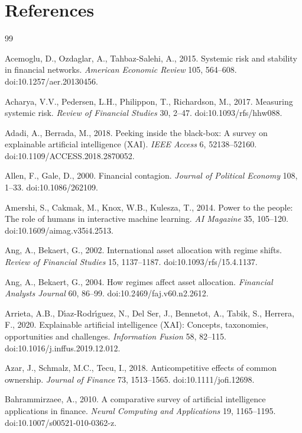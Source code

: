 \documentclass[11pt]{article}
\begin{document}
\clearpage
\endgroup
\fancyfoot[C]{\thepage}
\setcounter{page}{85}

\clearpage
\section*{References}
\small
\begin{thebibliography}{99}

Acemoglu, D., Ozdaglar, A., Tahbaz-Salehi, A., 2015. Systemic risk and stability in financial networks. \textit{American Economic Review} 105, 564--608. doi:10.1257/aer.20130456.

Acharya, V.V., Pedersen, L.H., Philippon, T., Richardson, M., 2017. Measuring systemic risk. \textit{Review of Financial Studies} 30, 2--47. doi:10.1093/rfs/hhw088.

Adadi, A., Berrada, M., 2018. Peeking inside the black-box: A survey on explainable artificial intelligence (XAI). \textit{IEEE Access} 6, 52138--52160. doi:10.1109/ACCESS.2018.2870052.

Allen, F., Gale, D., 2000. Financial contagion. \textit{Journal of Political Economy} 108, 1--33. doi:10.1086/262109.

Amershi, S., Cakmak, M., Knox, W.B., Kulesza, T., 2014. Power to the people: The role of humans in interactive machine learning. \textit{AI Magazine} 35, 105--120. doi:10.1609/aimag.v35i4.2513.

Ang, A., Bekaert, G., 2002. International asset allocation with regime shifts. \textit{Review of Financial Studies} 15, 1137--1187. doi:10.1093/rfs/15.4.1137.

Ang, A., Bekaert, G., 2004. How regimes affect asset allocation. \textit{Financial Analysts Journal} 60, 86--99. doi:10.2469/faj.v60.n2.2612.

Arrieta, A.B., D{\'\i}az-Rodr{\'\i}guez, N., Del Ser, J., Bennetot, A., Tabik, S., Herrera, F., 2020. Explainable artificial intelligence (XAI): Concepts, taxonomies, opportunities and challenges. \textit{Information Fusion} 58, 82--115. doi:10.1016/j.inffus.2019.12.012.

Azar, J., Schmalz, M.C., Tecu, I., 2018. Anticompetitive effects of common ownership. \textit{Journal of Finance} 73, 1513--1565. doi:10.1111/jofi.12698.

Bahrammirzaee, A., 2010. A comparative survey of artificial intelligence applications in finance. \textit{Neural Computing and Applications} 19, 1165--1195. doi:10.1007/s00521-010-0362-z.


\end{thebibliography}
\end{document}
